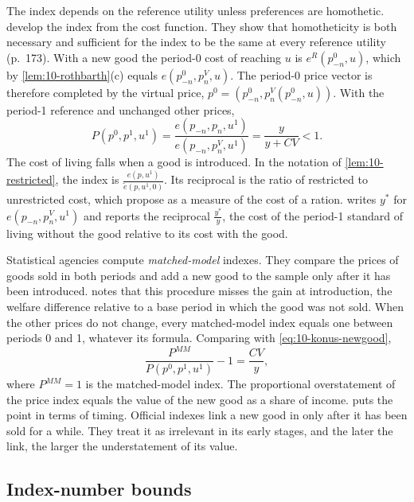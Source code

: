 The index depends on the reference utility unless preferences are homothetic.
\citet[Section~7.1, pp.~170--173]{DeatonMuellbauer1980b} develop the index from the cost function. They show that
homotheticity is both necessary and sufficient for the index to be the same at every reference utility (p.~173).
With a new good the period-0
cost of reaching $u$ is $e^R(p_{-n}^0,u)$, which by \cref{lem:10-rothbarth}(c) equals
$e(p_{-n}^0,p_n^V,u)$. The period-0 price vector is therefore completed by the virtual price,
$p^0 = (p_{-n}^0,p_n^V(p_{-n}^0,u))$. With the period-1 reference and unchanged other prices,
\begin{equation}\label{eq:10-konus-newgood}
  P(p^0,p^1,u^1) = \frac{e(p_{-n},p_n,u^1)}{e(p_{-n},p_n^V,u^1)} = \frac{y}{y + CV} < 1 .
\end{equation}
The cost of living falls when a good is introduced. In the notation of \cref{lem:10-restricted}, the index is
$\frac{e(p,u^1)}{\tilde e(p,u^1,0)}$. Its reciprocal is the ratio of restricted to unrestricted cost, which
\citet[Exercise~7.16, p.~184]{DeatonMuellbauer1980b} propose as a measure of the cost of a ration.
\citet[p.~212]{Hausman1997} writes $y^*$ for
$e(p_{-n},p_n^V,u^1)$ and reports the reciprocal $\frac{y^*}{y}$, the cost of the period-1 standard of
living without the good relative to its cost with the good.

Statistical agencies compute \emph{matched-model} indexes. They compare the prices of goods sold in both
periods and add a new good to the sample only after it has been introduced. \citet[p.~210, n.~1]{Hausman1997}
notes that this procedure misses the gain at introduction, the welfare difference relative to a base period
in which the good was not sold. When the other prices do not change, every matched-model index equals one
between periods 0 and 1, whatever its formula. Comparing with \eqref{eq:10-konus-newgood},
\begin{equation}\label{eq:10-newgoods-bias}
  \frac{P^{MM}}{P(p^0,p^1,u^1)} - 1 = \frac{CV}{y},
\end{equation}
where $P^{MM} = 1$ is the matched-model index. The proportional overstatement of the price index equals the
value of the new good as a share of income. \citet[pp.~237--238]{Bresnahan1997} puts the point in terms of
timing. Official indexes link a new good in only after it has been sold for a while. They treat it as
irrelevant in its early stages, and the later the link, the larger the understatement of its value.

\subsection{Index-number bounds}\label{sec:10-bounds}

